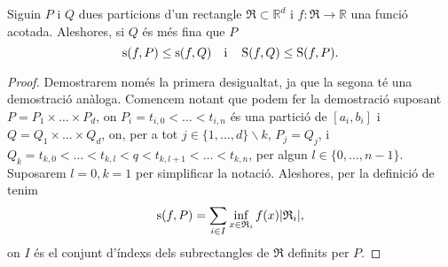\documentclass[../Apunts.tex]{subfiles}
\begin{document}
	\begin{proposition}
		\label{prop:finor, desigualtats i sumes}\label{prop:Particions supremes > ínfimes}
		Siguin \(P\) i \(Q\) dues particions d'un rectangle \(\mathfrak{R}\subset\mathbb{R}^{d}\) i \(f\colon\mathfrak{R}\to\mathbb{R}\) una funció acotada. Aleshores, si \(Q\) és més fina que \(P\)
		\[\operatorname{s}(f,P)\leq\operatorname{s}(f,Q)\quad\text{i}\quad\operatorname{S}(f,Q)\leq\operatorname{S}(f,P).\]
		\begin{proof}
			Demostrarem només la primera desigualtat, ja que la segona té una demostració anàloga. Comencem notant que podem fer la demostració suposant \(P=P_{1}\times\dots\times P_{d}\), on \(P_{i}=t_{i,0}<\dots<t_{i,n}\) és una partició de \([a_{i},b_{i}]\) i \(Q=Q_{1}\times\dots\times Q_{d}\), on, per a tot \(j\in\{1,\dots,d\}\smallsetminus k\), \(P_{j}=Q_{j}\), i \(Q_{k}=t_{k,0}<\dots<t_{k,l}<q<t_{k,l+1}<\dots<t_{k,n}\), per algun \(l\in\{0,\dots,n-1\}\). Suposarem \(l=0,k=1\) per simplificar la notació.
			Aleshores, per la definició de  tenim
			\[\sinf(f,P)=\sum_{i\in I}\inf_{x\in \mathfrak{R}_{i}}f(x)\abs{\mathfrak{R}_{i}},\]
			on \(I\) és el conjunt d'índexs dels subrectangles de \(\mathfrak{R}\) definits per \(P\).
			

\end{proof}
\end{proposition}
\end{document}
